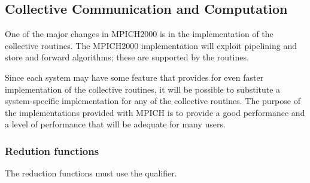 \documentclass{article}
\begin{document}
\subsubsection{}
\subsubsection{}
\subsubsection{}
\subsubsection{}
\subsubsection{}
\subsubsection{}
\subsubsection{}
\subsubsection{}

\subsection{Collective Communication and Computation}
One of the major changes in MPICH2000 is in the implementation of the
collective routines.  The MPICH2000 implementation will exploit
pipelining and store and forward algorithms; these are supported by
the  routines.  

Since each system may have some feature that provides for even faster
implementation of the collective routines, it will be possible to
substitute a system-specific implementation for any of the collective
routines.  The purpose of the implementations provided with MPICH is
to provide a good performance and a level of performance that will be adequate
for many users.  

\subsubsection{Redution functions}
The reduction functions must use the  qualifier.
\end{document}
